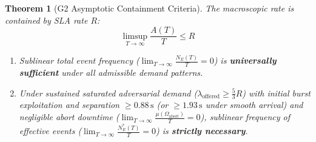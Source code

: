 \documentclass[conference]{IEEEtran}
\newtheorem{theorem}{Theorem}
\begin{document}
\begin{theorem}[G2 Asymptotic Containment Criteria]
The macroscopic rate is contained by SLA rate $R$:
\begin{equation}
\limsup_{T\to\infty} \frac{A(T)}{T} \le R
\end{equation}
\begin{enumerate}
    \item Sublinear total event frequency ($\lim_{T\to\infty} \frac{N_E(T)}{T} = 0$) is \textbf{universally sufficient} under all admissible demand patterns.
    \item Under sustained saturated adversarial demand ($\lambda_{\text{offered}} \ge \frac{5}{3} R$) with initial burst exploitation and separation $\ge 0.88\,\text{s}$ (or $\ge 1.93\,\text{s}$ under smooth arrival) and negligible abort downtime ($\lim_{T\to\infty} \frac{\mu(\Omega_{\text{abort}})}{T} = 0$), sublinear frequency of effective events ($\lim_{T\to\infty} \frac{N_E^*(T)}{T} = 0$) is \textbf{strictly necessary}.
\end{enumerate}
\end{theorem}
\end{document}

